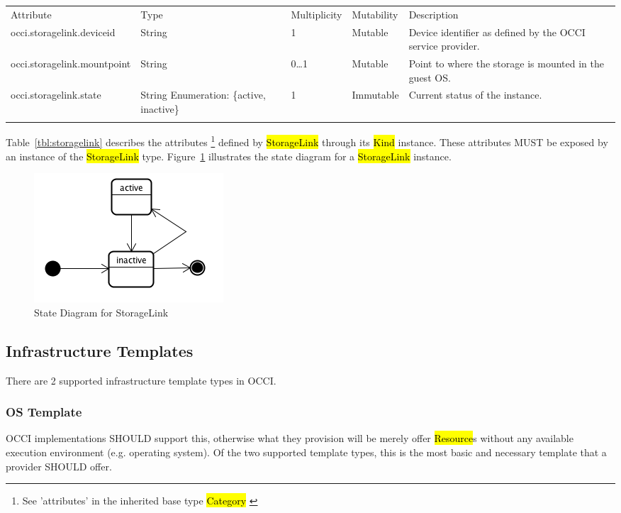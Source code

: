 \documentclass[10pt,a4paper]{article}
\begin{document}
{
	\begin{tabular}{lp{2.5cm}p{1cm}lp{6cm}}
	\toprule
	Attribute&Type&Multi\-plicity&Mutability&Description\\
	\colrule
	occi.storagelink.deviceid & String & 1 & Mutable 
	& Device identifier as defined by the OCCI service provider.\\
	occi.storagelink.mountpoint & String & 0\ldots1 & Mutable 
	& Point to where the storage is mounted in the guest OS.\\
	occi.storagelink.state & String Enumeration: \{active, inactive\}& 1 
	& Immutable & Current status of the instance.\\
	\botrule
	\end{tabular}
}

Table~\ref{tbl:storagelink} describes the attributes \footnote{See ’attributes’ in the inherited 
base type \hl{Category}  \cite{occi:core}} 
defined by \hl{StorageLink} through its \hl{Kind} instance. These attributes
MUST be exposed by an instance of the \hl{StorageLink} type. 
Figure~\ref{fig:storagelink_state} illustrates the state diagram for a \hl{StorageLink} instance.

\begin{figure}[!h]
	\centering
	\includegraphics[scale=0.4]{figs/infra-link-state.png}
	\caption{State Diagram for StorageLink}
	\label{fig:storagelink_state}
\end{figure}

\subsection{Infrastructure Templates}
There are 2 supported infrastructure template types in OCCI.

\subsubsection{OS Template}
OCCI implementations SHOULD support this, otherwise what they provision will be merely offer \hl
{Resource}s without any available execution environment (e.g. operating system). Of the two 
supported template types, this is the most basic and necessary template that a provider SHOULD offer. 
\end{document}
